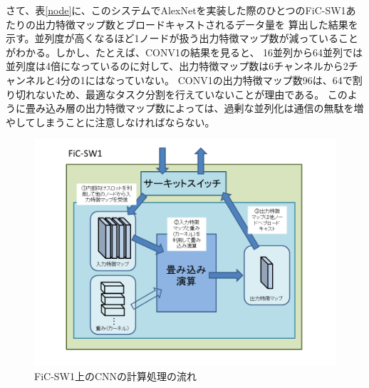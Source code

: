 さて、表\ref{node}に、このシステムでAlexNetを実装した際のひとつのFiC-SW1あたりの出力特徴マップ数とブロードキャストされるデータ量を
算出した結果を示す。並列度が高くなるほど1ノードが扱う出力特徴マップ数が減っていることがわかる。しかし、たとえば、CONV1の結果を見ると、
16並列から64並列では並列度は4倍になっているのに対して、出力特徴マップ数は6チャンネルから2チャンネルと4分の1にはなっていない。
CONV1の出力特徴マップ数96は、64で割り切れないため、最適なタスク分割を行えていないことが理由である。
このように畳み込み層の出力特徴マップ数によっては、過剰な並列化は通信の無駄を増やしてしまうことに注意しなければならない。

\begin{figure}[ht]  
 \begin{center}   
	\includegraphics[width=1.0\columnwidth,bb=0 0 720 540]{img/cnn_on_sw1.png}
  \caption{FiC-SW1上のCNNの計算処理の流れ}
  \label{fig_cnn_on_sw1}  
 \end{center}  
\end{figure}

